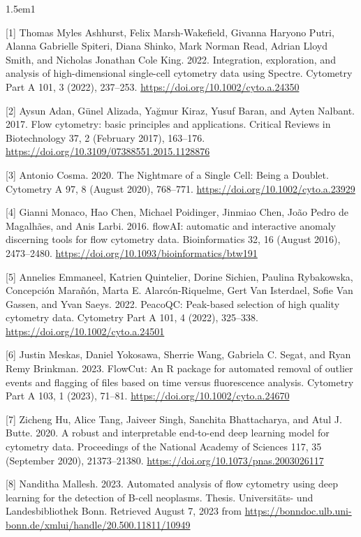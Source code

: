 \documentclass[ASNA]{latex/wiley/USG}
\begin{document}
\begin{hangparas}{1.5em}{1}

{[}1{]} Thomas Myles Ashhurst, Felix Marsh-Wakefield, Givanna Haryono
Putri, Alanna Gabrielle Spiteri, Diana Shinko, Mark Norman Read, Adrian
Lloyd Smith, and Nicholas Jonathan Cole King. 2022. Integration,
exploration, and analysis of high-dimensional single-cell cytometry data
using Spectre. Cytometry Part A 101, 3 (2022), 237--253.
\url{https://doi.org/10.1002/cyto.a.24350}

{[}2{]} Aysun Adan, Günel Alizada, Yağmur Kiraz, Yusuf Baran, and Ayten
Nalbant. 2017. Flow cytometry: basic principles and applications.
Critical Reviews in Biotechnology 37, 2 (February 2017), 163--176.
\url{https://doi.org/10.3109/07388551.2015.1128876}

{[}3{]} Antonio Cosma. 2020. The Nightmare of a Single Cell: Being a
Doublet. Cytometry A 97, 8 (August 2020), 768--771.
\url{https://doi.org/10.1002/cyto.a.23929}

{[}4{]} Gianni Monaco, Hao Chen, Michael Poidinger, Jinmiao Chen, João
Pedro de Magalhães, and Anis Larbi. 2016. flowAI: automatic and
interactive anomaly discerning tools for flow cytometry data.
Bioinformatics 32, 16 (August 2016), 2473--2480.
\url{https://doi.org/10.1093/bioinformatics/btw191}

{[}5{]} Annelies Emmaneel, Katrien Quintelier, Dorine Sichien, Paulina
Rybakowska, Concepción Marañón, Marta E. Alarcón-Riquelme, Gert Van
Isterdael, Sofie Van Gassen, and Yvan Saeys. 2022. PeacoQC: Peak-based
selection of high quality cytometry data. Cytometry Part A 101, 4
(2022), 325--338. \url{https://doi.org/10.1002/cyto.a.24501}

{[}6{]} Justin Meskas, Daniel Yokosawa, Sherrie Wang, Gabriela C. Segat,
and Ryan Remy Brinkman. 2023. FlowCut: An R package for automated
removal of outlier events and flagging of files based on time versus
fluorescence analysis. Cytometry Part A 103, 1 (2023), 71--81.
\url{https://doi.org/10.1002/cyto.a.24670}

{[}7{]} Zicheng Hu, Alice Tang, Jaiveer Singh, Sanchita Bhattacharya,
and Atul J. Butte. 2020. A robust and interpretable end-to-end deep
learning model for cytometry data. Proceedings of the National Academy
of Sciences 117, 35 (September 2020), 21373--21380.
\url{https://doi.org/10.1073/pnas.2003026117}

{[}8{]} Nanditha Mallesh. 2023. Automated analysis of flow cytometry
using deep learning for the detection of B-cell neoplasms. Thesis.
Universitäts- und Landesbibliothek Bonn. Retrieved August 7, 2023 from
\url{https://bonndoc.ulb.uni-bonn.de/xmlui/handle/20.500.11811/10949}


\end{hangparas}
\end{document}
